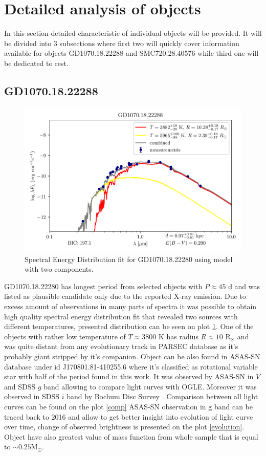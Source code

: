\documentclass{pracalicmgr}
\begin{document}
\section{Detailed analysis of objects}
In this section detailed characteristic of individual objects will be provided. It will be divided into $3$ subsections where first two will quickly cover information available for 
objects GD1070.18.22288 and SMC720.28.40576 while third one will be dedicated to rest.
\subsection{GD1070.18.22288}
\begin{figure}[H]
    \includegraphics{plots/GD1070.18.22288/GD1070.18.22288_double_emcee.png}
    \caption{Spectral Energy Distribution fit for GD1070.18.22280 using model with two components.}\label{GD1070SED}
\end{figure}
GD1070.18.22280 has longest period from selected objects with $P\approx 45$ d and was listed as plausible candidate only due to the reported X-ray emission. Due to excess amount of observations in 
many parts of spectra it was possible to obtain high quality spectral energy distribution fit that revealed two sources with different temperatures, presented distribution can be 
seen on plot \ref{GD1070SED}.
One of the objects with rather low temperature of 
$T\approx 3800$ K has radius $R\approx 10$ $\textrm{R}_{\odot}$ and was quite distant from any evolutionary track in PARSEC database as it's probably giant stripped by 
it's companion. Object can be also found in ASAS-SN database \citep{jayasinghe_asas-sn_2019} under id J170801.81-410255.6 where it's classified as rotational variable star
with half of the period found in this work. It was observed by ASAS-SN in $V$ and SDSS $g$ band allowing to compare light curves with OGLE. Moreover 
it was observed in SDSS $i$ band by Bochum Disc Survey \citep{hackstein_bochum_2015}. Comparison between all light curves can be found on the plot \ref{comp}
ASAS-SN observation in g band can be traced back to 2016 and allow to get better insight into evolution of light curve over time, change of observed brightness is presented on the
plot \ref{evolution}. Object have also greatest value of mass function from whole sample that is equal to $\sim 0.25 \textrm{M}_{\odot}$. 
\end{document}
